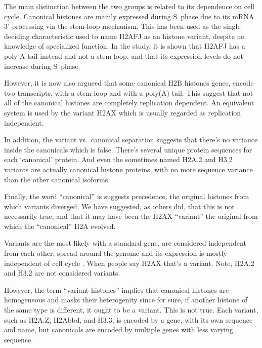   The main distinction between the two groups is related to its dependence on
  cell cycle. Canonical histones are mainly expressed during S~phase due to
  its mRNA 3' processing via the stem-loop mechanism. This has been used
  as the single deciding characteristic used to name H2AFJ as an histone variant,
  despite no knowledge of specialized function\citep{h2afj-report}. In the study,
  it is shown that H2AFJ has a poly-A tail instead and not a stem-loop, and that
  its expression levels do not increase during S--phase.

  However, it is now also argueed that some canonical H2B histones genes, encode
  two transcripts, with a stem-loop and with a poly(A) tail. This suggest
  that not all of the canonical histones are completely replication dependent.
  An equivalent system is used by the variant H2AX which is usually regarded
  as replication independent.


  In addition, the variant vs.~canonical separation suggests that there's no variance inside
  the canonicals which is false. There's several unique protein sequences for each
  `canonical' protein. And even the sometimes named H2A.2 and H3.2 variants are actually
  canonical histone proteins, with no more sequence variance than the other canonical
  isoforms.

  Finally, the word ``canonical'' is suggests precedence, the original histones
  from which variants diverged. We have suggested, as others did, that this
  is not necessarily true, and that it may have been the H2AX ``variant'' the
  original from which the ``canonical'' H2A evolved\citep{our-H2AX-review, henikoff2010-variants-evolution}.


  Variants are the most likely with a standard gene, are considered independent from each other,
  spread around the genome and its expression is mostly independent of cell cycle . When people say H2AX that's
  a variant. Note, H2A.2 and H3.2 are not considered variants.


  However, the term ``variant histones'' implies that canonical histones are
  homogeneous and masks their heterogenity since for sure, if another histone
  of the same type is different, it ought to be a variant. This is not
  true. Each variant, such as H2A.Z, H2Abbd, and H3.3,
  is encoded by a gene, with its own sequence and name,
  but canonicals are encoded by multiple genes with less varying sequence.

